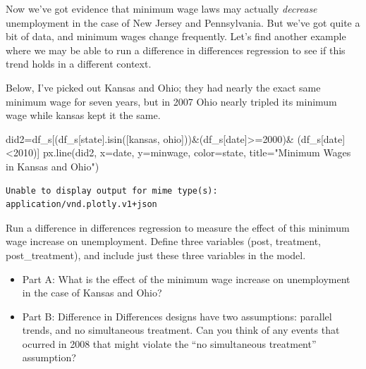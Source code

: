 \documentclass[
  letterpaper,
  DIV=11,
  numbers=noendperiod]{scrreprt}
\newenvironment{Shaded}{\begin{snugshade}}{\end{snugshade}}
\newcommand{\NormalTok}[1]{\textcolor[rgb]{0.00,0.23,0.31}{#1}}
\newcommand{\OperatorTok}[1]{\textcolor[rgb]{0.37,0.37,0.37}{#1}}
\newcommand{\StringTok}[1]{\textcolor[rgb]{0.13,0.47,0.30}{#1}}
\providecommand{\tightlist}{%
  \setlength{\itemsep}{0pt}\setlength{\parskip}{0pt}}\usepackage{longtable,booktabs,array}
\begin{document}
Now we've got evidence that minimum wage laws may actually
\emph{decrease} unemployment in the case of New Jersey and Pennsylvania.
But we've got quite a bit of data, and minimum wages change frequently.
Let's find another example where we may be able to run a difference in
differences regression to see if this trend holds in a different
context.

Below, I've picked out Kansas and Ohio; they had nearly the exact same
minimum wage for seven years, but in 2007 Ohio nearly tripled its
minimum wage while kansas kept it the same.

\begin{Shaded}
\begin{Highlighting}[]
\NormalTok{did2}\OperatorTok{=}\NormalTok{df\_s[(df\_s[}\StringTok{\textquotesingle{}state\textquotesingle{}}\NormalTok{].isin([}\StringTok{\textquotesingle{}kansas\textquotesingle{}}\NormalTok{, }\StringTok{\textquotesingle{}ohio\textquotesingle{}}\NormalTok{]))}\OperatorTok{\&}\NormalTok{(df\_s[}\StringTok{\textquotesingle{}date\textquotesingle{}}\NormalTok{]}\OperatorTok{\textgreater{}=}\StringTok{\textquotesingle{}2000\textquotesingle{}}\NormalTok{)}\OperatorTok{\&}\NormalTok{ (df\_s[}\StringTok{\textquotesingle{}date\textquotesingle{}}\NormalTok{]}\OperatorTok{\textless{}}\StringTok{\textquotesingle{}2010\textquotesingle{}}\NormalTok{)] }
\NormalTok{px.line(did2, x}\OperatorTok{=}\StringTok{\textquotesingle{}date\textquotesingle{}}\NormalTok{, y}\OperatorTok{=}\StringTok{\textquotesingle{}minwage\textquotesingle{}}\NormalTok{, color}\OperatorTok{=}\StringTok{\textquotesingle{}state\textquotesingle{}}\NormalTok{, title}\OperatorTok{=}\StringTok{"Minimum Wages in Kansas and Ohio"}\NormalTok{)}
\end{Highlighting}
\end{Shaded}

\begin{verbatim}
Unable to display output for mime type(s): application/vnd.plotly.v1+json
\end{verbatim}

Run a difference in differences regression to measure the effect of this
minimum wage increase on unemployment. Define three variables (post,
treatment, post\_treatment), and include just these three variables in
the model.

\begin{itemize}
\tightlist
\item
  Part A: What is the effect of the minimum wage increase on
  unemployment in the case of Kansas and Ohio?
\item
  Part B: Difference in Differences designs have two assumptions:
  parallel trends, and no simultaneous treatment. Can you think of any
  events that ocurred in 2008 that might violate the ``no simultaneous
  treatment'' assumption?
\end{itemize}
\end{document}
